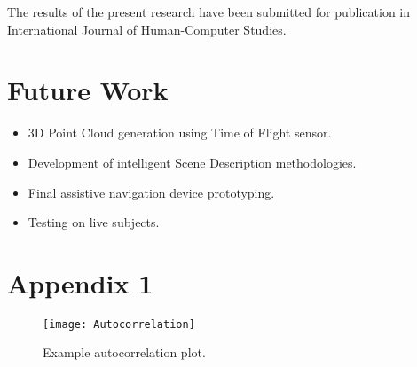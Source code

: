 \documentclass[
10pt,           %
a4paper,        %
oneside,        %
headinclude,footinclude, %
]{scrartcl}
\begin{document}
The results of the present research have been submitted for publication in International Journal of Human-Computer Studies.

\section{Future Work}
\begin{itemize}
  \item 3D Point Cloud generation using Time of Flight sensor.
  \item Development of intelligent Scene Description methodologies.
  \item Final assistive navigation device prototyping.
  \item Testing on live subjects.
\end{itemize}

\newpage

\renewcommand{\refname}{\spacedlowsmallcaps{References}} %



\newpage

\section*{Appendix 1}

\begin{figure}[h!]
  \begin{center}
    \texttt{[image: Autocorrelation]}
  \end{center}
  \vspace{-10pt}
  \caption*{\label{keypoint_feature}Example autocorrelation plot.}
  \vspace{-10pt}
\end{figure}


\newpage

\setlength{\voffset}{0cm}
\setlength{\hoffset}{0cm}



\setlength{\voffset}{-2.54cm}
\setlength{\hoffset}{-2.54cm}
\end{document}

